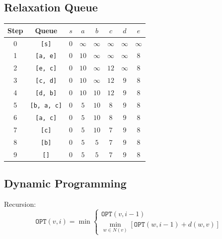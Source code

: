 \documentclass[10pt]{article}
\begin{document}
\subsection*{Relaxation Queue}
\begin{center}
    \begin{tabular}{c|c|cccccc}
        Step & Queue     & $s$ & $a$ & $b$ & $c$ & $d$ & $e$ \\ \hline
        0 & \texttt{[s]} & $0$ & $\infty$ & $\infty$ & $\infty$ & $\infty$ & $\infty$ \\
        1 & \texttt{[a, e]} & $0$ & $10$ & $\infty$ & $\infty$ & $\infty$ & $8$ \\
        2 & \texttt{[e, c]} & $0$ & $10$ & $\infty$ & $12$ & $\infty$ & $8$ \\
        3 & \texttt{[c, d]} & $0$ & $10$ & $\infty$ & $12$ & $9$ & $8$ \\
        4 & \texttt{[d, b]} & $0$ & $10$ & $10$ & $12$ & $9$ & $8$ \\
        5 & \texttt{[b, a, c]} & $0$ & $5$ & $10$ & $8$ & $9$ & $8$ \\
        6 & \texttt{[a, c]} & $0$ & $5$ & $10$ & $8$ & $9$ & $8$ \\
        7 & \texttt{[c]} & $0$ & $5$ & $10$ & $7$ & $9$ & $8$ \\
        8 & \texttt{[b]} & $0$ & $5$ & $5$ & $7$ & $9$ & $8$ \\
        9 & \texttt{[]} & $0$ & $5$ & $5$ & $7$ & $9$ & $8$ \\
    \end{tabular}
\end{center}

\subsection*{Dynamic Programming}
Recursion:
\[\texttt{OPT}(v, i) = \min \begin{cases}
\texttt{OPT}(v, i - 1) \\
\min_{w \in N(v)} \left[\texttt{OPT}(w, i - 1) + d(w, v)\right]
\end{cases}\]
\end{document}

